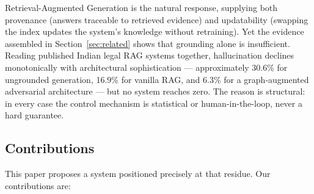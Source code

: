 \documentclass[conference]{IEEEtran}
\begin{document}
Retrieval-Augmented Generation \cite{lewis2020} is the natural response, supplying both provenance (answers traceable to retrieved evidence) and updatability (swapping the index updates the system's knowledge without retraining). Yet the evidence assembled in Section~\ref{sec:related} shows that grounding alone is insufficient. Reading published Indian legal RAG systems together, hallucination declines monotonically with architectural sophistication — approximately 30.6\% for ungrounded generation, 16.9\% for vanilla RAG, and 6.3\% for a graph-augmented adversarial architecture \cite{bindra2026} — but no system reaches zero. The reason is structural: in every case the control mechanism is statistical or human-in-the-loop, never a hard guarantee.

\subsection{Contributions}

This paper proposes a system positioned precisely at that residue. Our contributions are:
\end{document}
